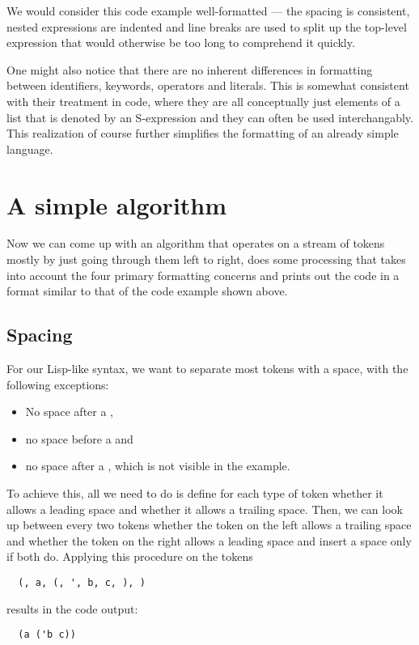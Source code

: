 We would consider this code example well-formatted ---
the spacing is consistent,
nested expressions are indented and
line breaks are used to split up the top-level expression
that would otherwise be too long to comprehend it quickly.

One might also notice that there are no inherent differences in formatting
between identifiers, keywords, operators and literals.
This is somewhat consistent with their treatment in code,
where they are all conceptually just elements of a list that is denoted by an
S-expression and they can often be used interchangably.
This realization of course further simplifies the formatting of an already simple language.

\section{A simple algorithm}
Now we can come up with an algorithm that operates on a stream of tokens
mostly by just going through them left to right,
does some processing that takes into account the four primary formatting concerns and
prints out the code in a format similar to that of the code example shown above.

\subsection{Spacing}
For our Lisp-like syntax, we want to separate most tokens with a space, with the following exceptions:
\begin{itemize}
  \item No space after a ,
  \item no space before a  and
  \item no space after a , which is not visible in the example.
\end{itemize}

To achieve this, all we need to do is define for each type of token
whether it allows a leading space and whether it allows a trailing space.
Then, we can look up between every two tokens
whether the token on the left allows a trailing space and
whether the token on the right allows a leading space and
insert a space only if both do.
Applying this procedure on the tokens
\begin{verbatim}
  (, a, (, ', b, c, ), )
\end{verbatim}
results in the code output:
\begin{verbatim}
  (a ('b c))
\end{verbatim}

